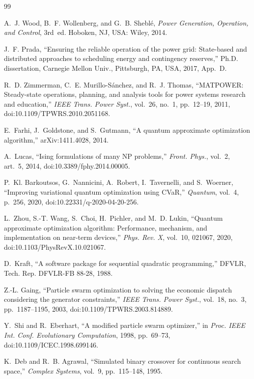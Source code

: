 \begin{thebibliography}{99}

 A.~J. Wood, B.~F. Wollenberg, and G.~B. Sheblé, \emph{Power Generation, Operation, and Control}, 3rd~ed. Hoboken, NJ, USA: Wiley, 2014.

 J.~F. Prada, ``Ensuring the reliable operation of the power grid: State-based and distributed approaches to scheduling energy and contingency reserves,'' Ph.D. dissertation, Carnegie Mellon Univ., Pittsburgh, PA, USA, 2017, App.~D.

 R.~D. Zimmerman, C.~E. Murillo-Sánchez, and R.~J. Thomas, ``MATPOWER: Steady-state operations, planning, and analysis tools for power systems research and education,'' \emph{IEEE Trans. Power Syst.}, vol.~26, no.~1, pp.~12--19, 2011, doi:10.1109/TPWRS.2010.2051168.

 E.~Farhi, J.~Goldstone, and S.~Gutmann, ``A quantum approximate optimization algorithm,'' arXiv:1411.4028, 2014.

 A.~Lucas, ``Ising formulations of many NP problems,'' \emph{Front. Phys.}, vol.~2, art.~5, 2014, doi:10.3389/fphy.2014.00005.

 P.~Kl. Barkoutsos, G.~Nannicini, A.~Robert, I.~Tavernelli, and S.~Woerner, ``Improving variational quantum optimization using CVaR,'' \emph{Quantum}, vol.~4, p.~256, 2020, doi:10.22331/q-2020-04-20-256.

 L.~Zhou, S.-T. Wang, S.~Choi, H.~Pichler, and M.~D. Lukin, ``Quantum approximate optimization algorithm: Performance, mechanism, and implementation on near-term devices,'' \emph{Phys. Rev. X}, vol.~10, 021067, 2020, doi:10.1103/PhysRevX.10.021067.

 D.~Kraft, ``A software package for sequential quadratic programming,'' DFVLR, Tech. Rep. DFVLR-FB 88-28, 1988.

 Z.-L. Gaing, ``Particle swarm optimization to solving the economic dispatch considering the generator constraints,'' \emph{IEEE Trans. Power Syst.}, vol.~18, no.~3, pp.~1187--1195, 2003, doi:10.1109/TPWRS.2003.814889.

 Y.~Shi and R.~Eberhart, ``A modified particle swarm optimizer,'' in \emph{Proc. IEEE Int. Conf. Evolutionary Computation}, 1998, pp.~69--73, doi:10.1109/ICEC.1998.699146.

 K.~Deb and R.~B. Agrawal, ``Simulated binary crossover for continuous search space,'' \emph{Complex Systems}, vol.~9, pp.~115--148, 1995.


\end{thebibliography}
